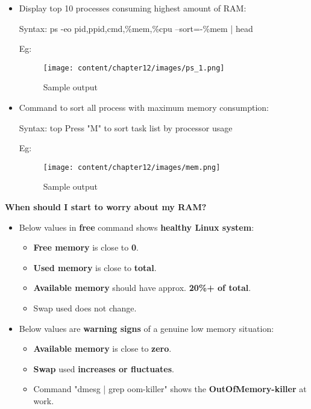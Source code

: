 \begin{flushleft}
\begin{itemize}
\begin{itemize}
\bigskip
\bigskip
	
	\end{itemize}
	
	\item Display top 10 processes consuming highest amount of RAM:
	\bigskip
	\begin{tcolorbox}[breakable,notitle,boxrule=-0pt,colback=pink,colframe=pink]
		\color{black}
		\font=9pt
		Syntax: ps -eo pid,ppid,cmd,\%mem,\%cpu --sort=-\%mem | head
		\font=4pt
	\end{tcolorbox}
	Eg:
	\begin{figure}[h!]
		\centering
		\texttt{[image: content/chapter12/images/ps\_1.png]}
		\caption{Sample output}
		\label{fig:ps_1}
	\end{figure}
	\newpage
	\item Command to sort all process with maximum memory consumption:
		\bigskip
	\begin{tcolorbox}[breakable,notitle,boxrule=-0pt,colback=pink,colframe=pink]
		\color{black}
		\font=9pt
		Syntax: top
		\newline
		\color{blue}
		Press "M" to sort task list by processor usage
		\font=4pt
	\end{tcolorbox}
	Eg:
	\begin{figure}[h!]
		\centering
		\texttt{[image: content/chapter12/images/mem.png]}
		\caption{Sample output}
		\label{fig:cpu25}
	\end{figure}
	
	
\end{itemize}

	\textbf{When should I start to worry about my RAM?}
	\bigskip
	\begin{itemize}
		\item Below values in \textbf{free} command shows \color{blue} \textbf{healthy Linux system}\color{black}:
		\begin{itemize}
			\item \textbf{Free memory} is close to \textbf{0}.
			\item \textbf{Used memory} is close to \textbf{total}.
			\item \textbf{Available memory} should have approx. \textbf{20\%+ of total}.
			\item Swap used does not change.
		\end{itemize}
		\bigskip
		\item  Below values are \color{red} \textbf{warning signs} \color{black} of a genuine low memory situation:
		\begin{itemize}
			\item \textbf{Available memory} is close to \textbf{zero}.
			\item \textbf{Swap} used \textbf{increases or fluctuates}.
			\item Command "dmesg | grep oom-killer" shows the \textbf{OutOfMemory-killer} at work.
		\end{itemize}
	\end{itemize}
	
	
\end{flushleft}

\newpage


